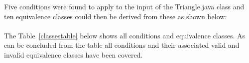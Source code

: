 Five conditions were found to apply to the input of the Triangle.java class and ten equivalence classes could then be derived from these as shown below: \\\\
%
%
%
%

\noindent The Table~\ref{classestable} below shows all conditions and equivalence classes. As can be concluded from the table all conditions and their associated valid and invalid equivalence classes have been covered.



